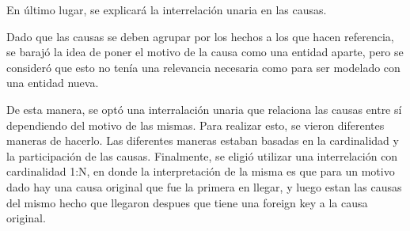 \bigskip

En último lugar, se explicará la interrelación unaria en las causas. 

Dado que las causas se deben agrupar por los hechos a los que hacen referencia, se barajó la idea de poner el motivo de la causa como una entidad aparte, pero se consideró que esto no tenía una relevancia necesaria como para ser modelado con una entidad nueva. 

De esta manera, se optó una interralación unaria que relaciona las causas entre sí dependiendo del motivo de las mismas. Para realizar esto, se vieron diferentes maneras de hacerlo. Las diferentes maneras estaban basadas en la cardinalidad y la participación de las causas. Finalmente, se eligió utilizar una interrelación con cardinalidad 1:N, en donde la interpretación de la misma es que para un motivo dado hay una causa original que fue la primera en llegar, y luego estan las causas del mismo hecho que llegaron despues que tiene una foreign key a la causa original.

\newpage
